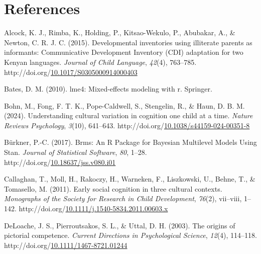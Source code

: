\documentclass[10pt, letterpaper]{article}
\begin{document}
\section{References}\label{references}

\setlength{\parindent}{-0.1in} 
\setlength{\leftskip}{0.125in}

\noindent

\label{refs}
\begin{CSLReferences}{1}{0}
Alcock, K. J., Rimba, K., Holding, P., Kitsao-Wekulo, P., Abubakar, A.,
\& Newton, C. R. J. C. (2015). Developmental inventories using
illiterate parents as informants: {Communicative} {Development}
{Inventory} ({CDI}) adaptation for two {Kenyan} languages. \emph{Journal
of Child Language}, \emph{42}(4), 763--785.
http://doi.org/\href{https://doi.org/10.1017/S0305000914000403}{10.1017/S0305000914000403}

Bates, D. M. (2010). lme4: Mixed-effects modeling with r. Springer.

Bohn, M., Fong, F. T. K., Pope-Caldwell, S., Stengelin, R., \& Haun, D.
B. M. (2024). Understanding cultural variation in cognition one child at
a time. \emph{Nature Reviews Psychology}, \emph{3}(10), 641--643.
http://doi.org/\href{https://doi.org/10.1038/s44159-024-00351-8}{10.1038/s44159-024-00351-8}

Bürkner, P.-C. (2017). Brms: {An} {R} {Package} for {Bayesian}
{Multilevel} {Models} {Using} {Stan}. \emph{Journal of Statistical
Software}, \emph{80}, 1--28.
http://doi.org/\href{https://doi.org/10.18637/jss.v080.i01}{10.18637/jss.v080.i01}

Callaghan, T., Moll, H., Rakoczy, H., Warneken, F., Liszkowski, U.,
Behne, T., \& Tomasello, M. (2011). Early social cognition in three
cultural contexts. \emph{Monographs of the Society for Research in Child
Development}, \emph{76}(2), vii--viii, 1--142.
http://doi.org/\href{https://doi.org/10.1111/j.1540-5834.2011.00603.x}{10.1111/j.1540-5834.2011.00603.x}

DeLoache, J. S., Pierroutsakos, S. L., \& Uttal, D. H. (2003). The
origins of pictorial competence. \emph{Current Directions in
Psychological Science}, \emph{12}(4), 114--118.
http://doi.org/\href{https://doi.org/10.1111/1467-8721.01244}{10.1111/1467-8721.01244}


\end{CSLReferences}
\end{document}
